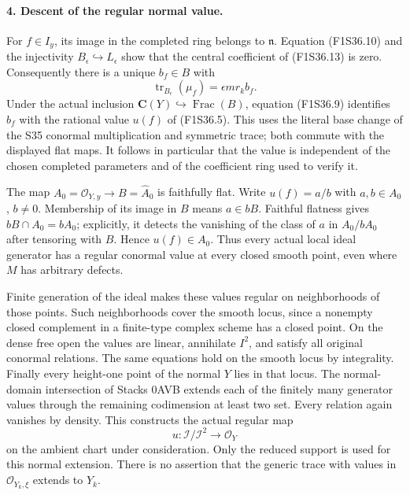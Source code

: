 \paragraph{4. Descent of the regular normal value.}
For $f\in I_y$, its image in the completed
ring belongs to $\mathfrak n$.
Equation (F1S36.10) and the injectivity
$B_\epsilon\hookrightarrow L_\epsilon$ show that
the central coefficient of (F1S36.13) is zero.
Consequently there is a unique $b_f\in B$ with
\[
       \operatorname{tr}_{B_\epsilon}(\mu_f)
                     =\epsilon m r_k b_f.
 \tag{F1S36.14}
\]
Under the actual inclusion
$\mathbf C(Y)\hookrightarrow\operatorname{Frac}(B)$,
equation (F1S36.9) identifies $b_f$ with the
rational value $u(f)$ of (F1S36.5).
This uses the literal base change of the S35
conormal multiplication and symmetric trace;
both commute with the displayed flat maps.
It follows in particular that the value is
independent of the chosen completed parameters
and of the coefficient ring used to verify it.

The map $A_0=\mathcal O_{Y,y}\to B=\widehat A_0$
is faithfully flat. Write $u(f)=a/b$ with
$a,b\in A_0$, $b\ne0$.
Membership of its image in $B$ means
$a\in bB$. Faithful flatness gives
$bB\cap A_0=bA_0$; explicitly, it detects
the vanishing of the class of $a$ in
$A_0/bA_0$ after tensoring with $B$.
Hence $u(f)\in A_0$.
Thus every actual local ideal generator has a
regular conormal value at every closed smooth
point, even where $M$ has arbitrary defects.

Finite generation of the ideal makes these
values regular on neighborhoods of those
points. Such neighborhoods cover the smooth
locus, since a nonempty closed complement in
a finite-type complex scheme has a closed point.
On the dense free open the values are linear,
annihilate $I^2$, and satisfy all original
conormal relations. The same equations hold
on the smooth locus by integrality.
Finally every height-one point of the normal
$Y$ lies in that locus. The normal-domain
intersection of Stacks 0AVB extends each of
the finitely many generator values through
the remaining codimension at least two set.
Every relation again vanishes by density.
This constructs the actual regular map
\[
                    u:\mathcal I/\mathcal I^2
                                       \longrightarrow\mathcal O_Y
 \tag{F1S36.15}
\]
on the ambient chart under consideration.
Only the reduced support is used for this
normal extension. There is no assertion that
the generic trace with values in
$\mathcal O_{Y_k,\xi}$ extends to $Y_k$.

